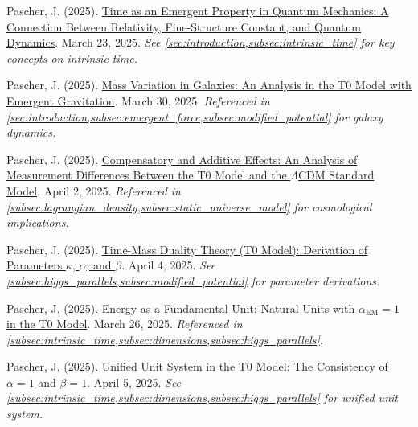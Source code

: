 \documentclass[12pt,a4paper]{article}
\newcommand{\alphaEM}{\alpha_{\text{EM}}}
\begin{document}
	\begin{thebibliography}{9}
		 Pascher, J. (2025). \href{https://github.com/jpascher/T0-Time-Mass-Duality/tree/main/2/pdf/English/ZeitEmergentQMEn.pdf}{Time as an Emergent Property in Quantum Mechanics: A Connection Between Relativity, Fine-Structure Constant, and Quantum Dynamics}. March 23, 2025. \textit{See \cref{sec:introduction,subsec:intrinsic_time} for key concepts on intrinsic time.}
		
		 Pascher, J. (2025). \href{https://github.com/jpascher/T0-Time-Mass-Duality/tree/main/2/pdf/English/MassVarGalaxienEn.pdf}{Mass Variation in Galaxies: An Analysis in the T0 Model with Emergent Gravitation}. March 30, 2025. \textit{Referenced in \cref{sec:introduction,subsec:emergent_force,subsec:modified_potential} for galaxy dynamics.}
		
		 Pascher, J. (2025). \href{https://github.com/jpascher/T0-Time-Mass-Duality/tree/main/2/pdf/English/MessdifferenzenT0StandardEn.pdf}{Compensatory and Additive Effects: An Analysis of Measurement Differences Between the T0 Model and the $\Lambda$CDM Standard Model}. April 2, 2025. \textit{Referenced in \cref{subsec:lagrangian_density,subsec:static_universe_model} for cosmological implications.}
		
		 Pascher, J. (2025). \href{https://github.com/jpascher/T0-Time-Mass-Duality/tree/main/2/pdf/English/ZeitMasseT0ParamsEn.pdf}{Time-Mass Duality Theory (T0 Model): Derivation of Parameters $\kappa$, $\alpha$, and $\beta$}. April 4, 2025. \textit{See \cref{subsec:higgs_parallels,subsec:modified_potential} for parameter derivations.}
		
		 Pascher, J. (2025). \href{https://github.com/jpascher/T0-Time-Mass-Duality/tree/main/2/pdf/English/NatEinheitenAlpha1En.pdf}{Energy as a Fundamental Unit: Natural Units with $\alphaEM = 1$ in the T0 Model}. March 26, 2025. \textit{Referenced in \cref{subsec:intrinsic_time,subsec:dimensions,subsec:higgs_parallels}.}
		
		 Pascher, J. (2025). \href{https://github.com/jpascher/T0-Time-Mass-Duality/tree/main/2/pdf/English/Alpha1Beta1KonsistenzEn.pdf}{Unified Unit System in the T0 Model: The Consistency of $\alpha = 1$ and $\beta = 1$}. April 5, 2025. \textit{See \cref{subsec:intrinsic_time,subsec:dimensions,subsec:higgs_parallels} for unified unit system.}
		

\end{thebibliography}
\end{document}
